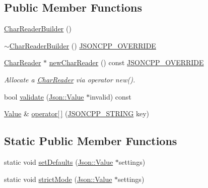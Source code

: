 \subsection*{Public Member Functions}
\begin{DoxyCompactItemize}
\item 
\hyperlink{class_json_1_1_char_reader_builder_a6e197b69a2ede3d87b03b9c5c78ba46a}{Char\+Reader\+Builder} ()
\item 
\hyperlink{class_json_1_1_char_reader_builder_ae8226503f5b947e9d618c39dd992c85c}{$\sim$\+Char\+Reader\+Builder} () \hyperlink{json_8h_a824d6199c91488107e443226fa6022c5}{J\+S\+O\+N\+C\+P\+P\+\_\+\+O\+V\+E\+R\+R\+I\+DE}
\item 
\hyperlink{class_json_1_1_char_reader}{Char\+Reader} $\ast$ \hyperlink{class_json_1_1_char_reader_builder_a3a262fcc76c1eb8eebfd4718fb4e9722}{new\+Char\+Reader} () const \hyperlink{json_8h_a824d6199c91488107e443226fa6022c5}{J\+S\+O\+N\+C\+P\+P\+\_\+\+O\+V\+E\+R\+R\+I\+DE}
\begin{DoxyCompactList}\small\item\em Allocate a \hyperlink{class_json_1_1_char_reader}{Char\+Reader} via operator new(). \end{DoxyCompactList}\item 
bool \hyperlink{class_json_1_1_char_reader_builder_af890b5cb70e9b372e41de5c9e6535d21}{validate} (\hyperlink{class_json_1_1_value}{Json\+::\+Value} $\ast$invalid) const
\item 
\hyperlink{class_json_1_1_value}{Value} \& \hyperlink{class_json_1_1_char_reader_builder_a84b35ef443340c06c0aa7b47851d8d86}{operator\mbox{[}$\,$\mbox{]}} (\hyperlink{json_8h_a1e723f95759de062585bc4a8fd3fa4be}{J\+S\+O\+N\+C\+P\+P\+\_\+\+S\+T\+R\+I\+NG} key)
\end{DoxyCompactItemize}
\subsection*{Static Public Member Functions}
\begin{DoxyCompactItemize}
\item 
static void \hyperlink{class_json_1_1_char_reader_builder_a03ff031e06aabff989ab4addc87294ab}{set\+Defaults} (\hyperlink{class_json_1_1_value}{Json\+::\+Value} $\ast$settings)
\item 
static void \hyperlink{class_json_1_1_char_reader_builder_a9c19e3c5475f9072d527810d4bf56749}{strict\+Mode} (\hyperlink{class_json_1_1_value}{Json\+::\+Value} $\ast$settings)
\end{DoxyCompactItemize}

